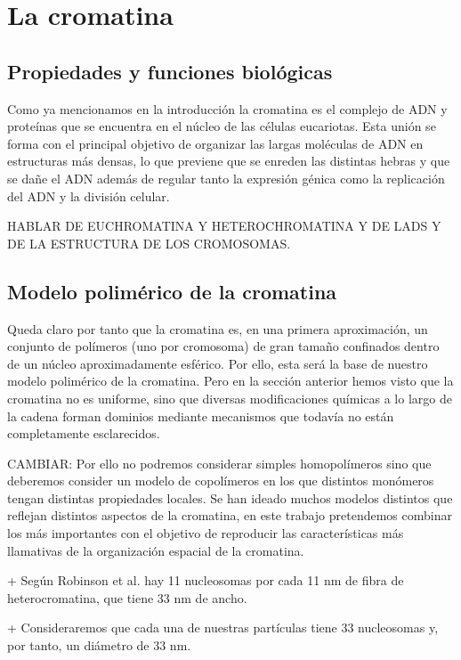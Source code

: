 \chapter{La cromatina}
\label{cap:chromatin}

\section{Propiedades y funciones biológicas}

Como ya mencionamos en la introducción la cromatina es el complejo de ADN y proteínas que se encuentra en el núcleo de las células eucariotas. Esta unión se forma con el principal objetivo de organizar las largas moléculas de ADN en estructuras más densas, lo que previene que se enreden las distintas hebras y que se dañe el ADN además de regular tanto la expresión génica como la replicación del ADN y la división celular.

HABLAR DE EUCHROMATINA Y HETEROCHROMATINA Y DE LADS Y DE LA ESTRUCTURA DE LOS CROMOSOMAS.

\section{Modelo polimérico de la cromatina}

Queda claro por tanto que la cromatina es, en una primera aproximación, un conjunto de polímeros (uno por cromosoma) de gran tamaño confinados dentro de un núcleo aproximadamente esférico. Por ello, esta será la base de nuestro modelo polimérico de la cromatina. Pero en la sección anterior hemos visto que la cromatina no es uniforme, sino que diversas modificaciones químicas a lo largo de la cadena forman dominios mediante mecanismos que todavía no están completamente esclarecidos.

CAMBIAR: Por ello no podremos considerar simples homopolímeros sino que deberemos consider un modelo de copolímeros en los que distintos monómeros tengan distintas propiedades locales. Se han ideado muchos modelos distintos que reflejan distintos aspectos de la cromatina, en este trabajo pretendemos combinar los más importantes con el objetivo de reproducir las características más llamativas de la organización espacial de la cromatina.

+ Según Robinson et al. hay 11 nucleosomas por cada 11 nm de fibra de heterocromatina, que tiene 33 nm de ancho.

+ Consideraremos que cada una de nuestras partículas tiene 33 nucleosomas y, por tanto, un diámetro de 33 nm.

